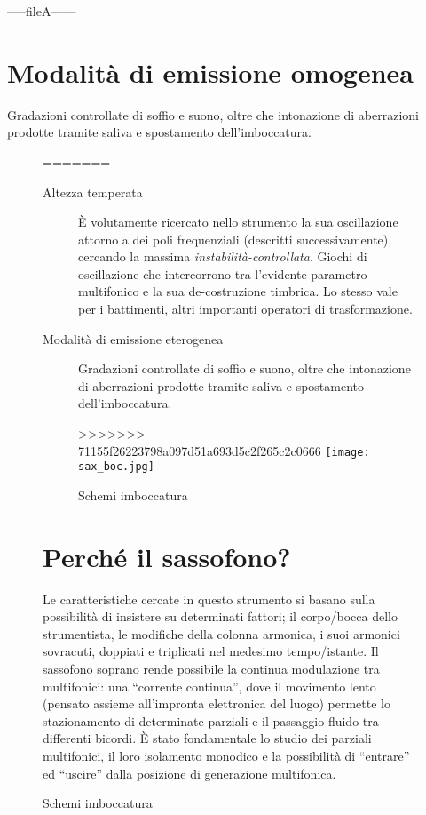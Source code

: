 -----fileA------



\section{Modalità di emissione omogenea}

Gradazioni controllate di soffio e suono, oltre che intonazione di aberrazioni prodotte tramite saliva e spostamento dell'imboccatura.

\begin{figure}
=======
\begin{description}
	\item[ Altezza temperata ] È volutamente ricercato nello strumento la sua
	oscillazione  attorno a dei poli frequenziali (descritti successivamente),
	cercando la massima \emph{instabilità-controllata}. Giochi di oscillazione che
	intercorrono tra l’evidente parametro multifonico e la sua de-costruzione
	timbrica. Lo stesso vale per i battimenti, altri importanti operatori di
	trasformazione.
	\item[ Modalità di emissione eterogenea ] Gradazioni controllate di soffio e
	suono, oltre che intonazione di aberrazioni prodotte tramite saliva e
	spostamento dell'imboccatura.     
\end{description}

\begin{figure}[h]
>>>>>>> 71155f26223798a097d51a693d5c2f265c2c0666
\centering
{\texttt{[image: sax\_boc.jpg]}}
\caption[Schemi imboccatura]{Schemi imboccatura}
\label{fig:imboccatura}
\end{figure}

\section{Perché il sassofono?}

Le caratteristiche cercate in questo strumento si basano sulla possibilità
di insistere su determinati fattori; il corpo/bocca dello strumentista,
le modifiche della colonna armonica, i suoi armonici sovracuti, doppiati
e triplicati nel medesimo tempo/istante.
Il sassofono soprano rende possibile la continua modulazione tra multifonici:
una “corrente continua”,  dove il movimento lento (pensato assieme all'impronta
elettronica del luogo) permette lo stazionamento di determinate parziali
e il passaggio fluido tra differenti bicordi. È stato fondamentale lo studio
dei parziali multifonici, il loro isolamento monodico e la possibilità di
“entrare” ed “uscire” dalla posizione di generazione multifonica.


\end{figure}
